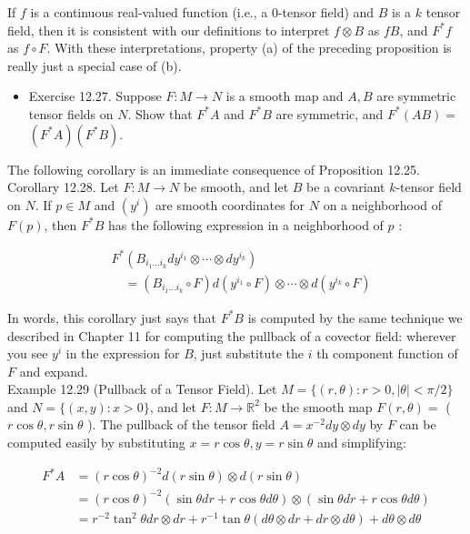 \documentclass[10pt, letterpaper]{article}
\begin{document}
If $f$ is a continuous real-valued function (i.e., a 0-tensor field) and $B$ is a $k$ tensor field, then it is consistent with our definitions to interpret $f \otimes B$ as $f B$, and $F^{*} f$ as $f \circ F$. With these interpretations, property (a) of the preceding proposition is really just a special case of (b).

\begin{itemize}
  \item Exercise 12.27. Suppose $F: M \rightarrow N$ is a smooth map and $A, B$ are symmetric tensor fields on $N$. Show that $F^{*} A$ and $F^{*} B$ are symmetric, and $F^{*}(A B)=$ $\left(F^{*} A\right)\left(F^{*} B\right)$.
\end{itemize}

The following corollary is an immediate consequence of Proposition 12.25.\\
Corollary 12.28. Let $F: M \rightarrow N$ be smooth, and let $B$ be a covariant $k$-tensor field on $N$. If $p \in M$ and $\left(y^{i}\right)$ are smooth coordinates for $N$ on a neighborhood of $F(p)$, then $F^{*} B$ has the following expression in a neighborhood of $p$ :

$$
\begin{aligned}
& F^{*}\left(B_{i_{1} \ldots i_{k}} d y^{i_{1}} \otimes \cdots \otimes d y^{i_{k}}\right) \\
& \quad=\left(B_{i_{1} \ldots i_{k}} \circ F\right) d\left(y^{i_{1}} \circ F\right) \otimes \cdots \otimes d\left(y^{i_{k}} \circ F\right)
\end{aligned}
$$

In words, this corollary just says that $F^{*} B$ is computed by the same technique we described in Chapter 11 for computing the pullback of a covector field: wherever\\
you see $y^{i}$ in the expression for $B$, just substitute the $i$ th component function of $F$ and expand.\\
Example 12.29 (Pullback of a Tensor Field). Let $M=\{(r, \theta): r>0,|\theta|<\pi / 2\}$ and $N=\{(x, y): x>0\}$, and let $F: M \rightarrow \mathbb{R}^{2}$ be the smooth map $F(r, \theta)=$ ( $r \cos \theta, r \sin \theta$ ). The pullback of the tensor field $A=x^{-2} d y \otimes d y$ by $F$ can be computed easily by substituting $x=r \cos \theta, y=r \sin \theta$ and simplifying:

$$
\begin{aligned}
F^{*} A & =(r \cos \theta)^{-2} d(r \sin \theta) \otimes d(r \sin \theta) \\
& =(r \cos \theta)^{-2}(\sin \theta d r+r \cos \theta d \theta) \otimes(\sin \theta d r+r \cos \theta d \theta) \\
& =r^{-2} \tan ^{2} \theta d r \otimes d r+r^{-1} \tan \theta(d \theta \otimes d r+d r \otimes d \theta)+d \theta \otimes d \theta
\end{aligned}
$$
\end{document}
